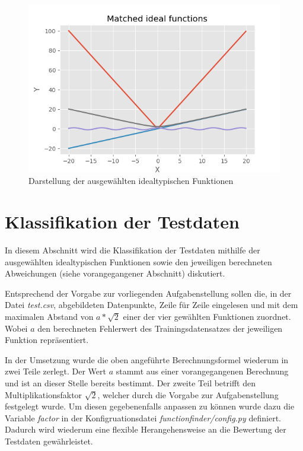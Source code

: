 \begin{figure}[h]
\centering
\includegraphics[width=13cm]{../output/figures/ideal.png}
\caption{Darstellung der ausgewählten idealtypischen Funktionen \cite{Gage:18}}
\label{fig:ideal}
\end{figure}

\section{Klassifikation der Testdaten}

In diesem Abschnitt wird die Klassifikation der Testdaten mithilfe der ausgewählten idealtypischen Funktionen sowie den jeweiligen berechneten Abweichungen (siehe vorangegangener Abschnitt) diskutiert.

Entsprechend der Vorgabe zur vorliegenden Aufgabenstellung sollen die, in der Datei \emph{test.csv}, abgebildeten Datenpunkte, Zeile für Zeile eingelesen und mit dem maximalen Abstand von $ a*\sqrt{2}$ einer der vier gewählten Funktionen zuordnet. Wobei $a$ den berechneten Fehlerwert des Trainingsdatensatzes der jeweiligen Funktion repräsentiert.

In der Umsetzung wurde die oben angeführte Berechnungsformel wiederum in zwei Teile zerlegt. Der Wert $a$ stammt aus einer vorangegangenen Berechnung und ist an dieser Stelle bereits bestimmt. Der zweite Teil betrifft den Multiplikationsfaktor $\sqrt{2}$, welcher durch die Vorgabe zur Aufgabenstellung festgelegt wurde. Um diesen gegebenenfalls anpassen zu können wurde dazu die Variable \emph{factor} in der Konfigruationsdatei \emph{functionfinder/config.py} definiert. Dadurch wird wiederum eine flexible Herangehensweise an die Bewertung der Testdaten gewährleistet.


